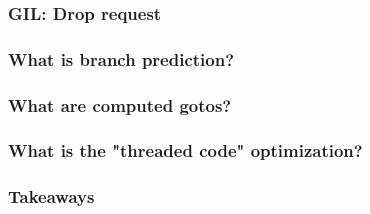 \begin{frame}
\frametitle{GIL: Drop request}
\end{frame}

\begin{frame}
\frametitle{What is branch prediction?}
\end{frame}

\begin{frame}
\frametitle{What are computed gotos?}
\end{frame}

\begin{frame}
\frametitle{What is the "threaded code" optimization?}
\end{frame}

\begin{frame}
\frametitle{Takeaways}
\end{frame}


